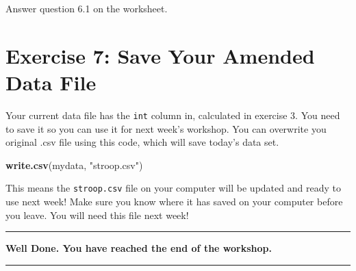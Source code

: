\documentclass[
]{book}
\newenvironment{Shaded}{\begin{snugshade}}{\end{snugshade}}
\newcommand{\FunctionTok}[1]{\textcolor[rgb]{0.13,0.29,0.53}{\textbf{#1}}}
\newcommand{\NormalTok}[1]{#1}
\newcommand{\StringTok}[1]{\textcolor[rgb]{0.31,0.60,0.02}{#1}}
\let\oldsection\section
\renewcommand{\section}{\needspace{5\baselineskip}\oldsection}
\begin{document}
Answer question 6.1 on the worksheet.

\section{Exercise 7: Save Your Amended Data File}\label{exercise-7-save-your-amended-data-file}

Your current data file has the \texttt{int} column in, calculated in exercise 3. You need to save it so you can use it for next week's workshop. You can overwrite you original .csv file using this code, which will save today's data set.

\begin{Shaded}
\begin{Highlighting}[]
\FunctionTok{write.csv}\NormalTok{(mydata, }\StringTok{"stroop.csv"}\NormalTok{)}
\end{Highlighting}
\end{Shaded}

This means the \texttt{stroop.csv} file on your computer will be updated and ready to use next week! Make sure you know where it has saved on your computer before you leave. You will need this file next week!

\begin{center}\rule{0.5\linewidth}{0.5pt}\end{center}

\textbf{Well Done. You have reached the end of the workshop.}

\begin{center}\rule{0.5\linewidth}{0.5pt}\end{center}


\end{document}
